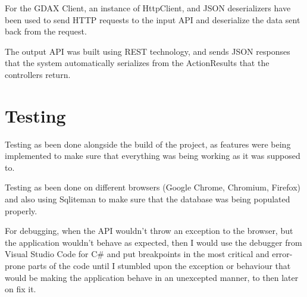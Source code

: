 \captionsetup{type=figure}


For the GDAX Client, an instance of HttpClient, and JSON deserializers have been used to send HTTP requests to the input API and deserialize the data sent back from the request.

The output API was built using REST technology, and sends JSON responses that the system automatically serializes from the ActionResults that the controllers return.
\section{Testing}
Testing as been done alongside the build of the project, as features were being implemented to make sure that everything was being working as it was supposed to.

Testing as been done on different browsers (Google Chrome, Chromium, Firefox) and also using Sqliteman to make sure that the database was being populated properly.

For debugging, when the API wouldn't throw an exception to the browser, but the application wouldn't behave as expected, then I would use the debugger from Visual Studio Code for C# and put breakpoints in the most critical and error-prone parts of the code until I stumbled upon the exception or behaviour that would be making the application behave in an unexcepted manner, to then later on fix it.